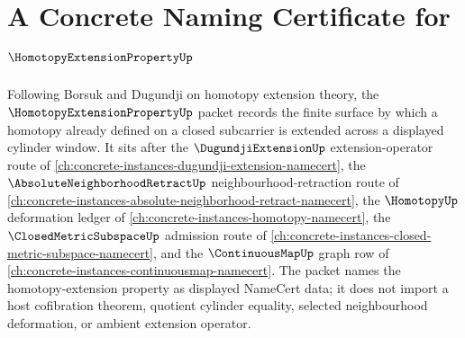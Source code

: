 \chapter{A Concrete Naming Certificate for $\HomotopyExtensionPropertyUp$}
\label{ch:concrete-instances-homotopy-extension-property-namecert}

Following Borsuk and Dugundji on homotopy extension theory, the $\HomotopyExtensionPropertyUp$ packet records the finite surface by which a homotopy already defined on a closed subcarrier is extended across a displayed cylinder window. It sits after the $\DugundjiExtensionUp$ extension-operator route of \autoref{ch:concrete-instances-dugundji-extension-namecert}, the $\AbsoluteNeighborhoodRetractUp$ neighbourhood-retraction route of \autoref{ch:concrete-instances-absolute-neighborhood-retract-namecert}, the $\HomotopyUp$ deformation ledger of \autoref{ch:concrete-instances-homotopy-namecert}, the $\ClosedMetricSubspaceUp$ admission route of \autoref{ch:concrete-instances-closed-metric-subspace-namecert}, and the $\ContinuousMapUp$ graph row of \autoref{ch:concrete-instances-continuousmap-namecert}. The packet names the homotopy-extension property as displayed NameCert data; it does not import a host cofibration theorem, quotient cylinder equality, selected neighbourhood deformation, or ambient extension operator.

